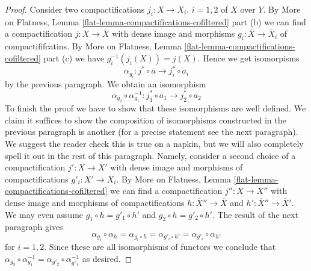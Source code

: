 \begin{proof}
\medskip\noindent
Consider two compactifications $j_i : X \to \overline{X}_i$, $i = 1, 2$
of $X$ over $Y$. By More on Flatness, Lemma
\ref{flat-lemma-compactifications-cofiltered} part (b)
we can find a compactification $j : X \to \overline{X}$
with dense image and morphisms
$g_i : \overline{X} \to \overline{X}_i$ of compactififcatins.
By More on Flatness, Lemma
\ref{flat-lemma-compactifications-cofiltered} part (c)
we have $g_i^{-1}(j_i(X)) = j(X)$. Hence we get isomorpisms
$$
\alpha_{g_i} :
j^* \circ \overline{a}
\longrightarrow
j_i^* \circ \overline{a}_i
$$
by the previous paragraph. We obtain an isomorphism
$$
\alpha_{g_2} \circ \alpha_{g_1}^{-1} :
j_1^* \circ \overline{a}_1 \to j_2^* \circ \overline{a}_2
$$
To finish the proof we have to show that these isomorphisms are well defined.
We claim it suffices to show the composition of isomorphisms constructed
in the previous paragraph is another (for a precise statement see the next
paragraph). We suggest the reader check this is true on a napkin, but we
will also completely spell it out in the rest of this paragraph.
Namely, consider a second choice of a compactification
$j' : X \to \overline{X}'$ with dense image
and morphisms of compactifications $g'_i : \overline{X}' \to \overline{X}_i$.
By More on Flatness, Lemma \ref{flat-lemma-compactifications-cofiltered}
we can find a compactification $j'' : X \to \overline{X}''$
with dense image and morphisms of compactifications
$h : \overline{X}'' \to \overline{X}$ and
$h' : \overline{X}'' \to \overline{X}'$. We may even assume
$g_1 \circ h = g'_1 \circ h'$ and $g_2 \circ h = g'_2 \circ h'$.
The result of the next paragraph gives
$$
\alpha_{g_i} \circ \alpha_h = \alpha_{g_i \circ h} =
\alpha_{g'_i \circ h'} = \alpha_{g'_i} \circ \alpha_{h'}
$$
for $i = 1, 2$. Since these are all isomorphisms of functors
we conclude that $\alpha_{g_2} \circ \alpha_{g_1}^{-1} =
\alpha_{g'_2} \circ \alpha_{g'_1}^{-1}$ as desired.


\end{proof}

